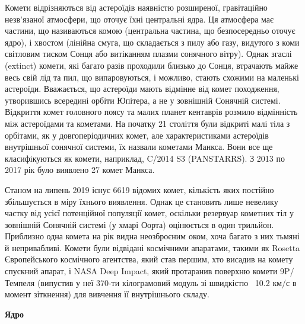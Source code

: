 \documentclass[a4paper]{article}
\begin{document}
    Комети відрізняються від астероїдів наявністю розширеної, гравітаційно незв'язаної атмосфери, що оточує їхні центральні ядра. Ця атмосфера має частини, що називаються комою (центральна частина, що безпосередньо оточує ядро), і хвостом (лінійна смуга, що складається з пилу або газу, видутого з коми світловим тиском Сонця або витіканням плазми сонячного вітру). Однак згаслі (extinct) комети, які багато разів проходили близько до Сонця, втрачають майже весь свій лід та пил, що випаровуються, і можливо, стають схожими на маленькі астероїди. Вважається, що астероїди мають відмінне від комет походження, утворившись всередині орбіти Юпітера, а не у зовнішній Сонячній системі. Відкриття комет головного поясу та малих планет кентаврів\cite{14} розмило відмінність між астероїдами та кометами. На початку 21 століття були відкриті малі тіла з орбітами, як у довгоперіодичних комет, але характеристиками астероїдів внутрішньої сонячної системи, їх назвали кометами Манкса. Вони все ще класифікуються як комети, наприклад, C/2014 S3 (PANSTARRS). З 2013 по 2017 рік було виявлено 27 комет Манкса.
    
    Станом на липень 2019 існує 6619 відомих комет, кількість яких постійно збільшується в міру їхнього виявлення. Однак це становить лише невелику частку від усієї потенційної популяції комет, оскільки резервуар кометних тіл у зовнішній Сонячній системі (у хмарі Оорта) оцінюється в один трильйон. Приблизно одна комета на рік видна неозброєним оком, хоча багато з них тьмяні й непривабливі. Комети були відвідані космічними апаратами, такими як Rosetta Європейського космічного агентства, який став першим, хто висадив на комету спускний апарат, і NASA Deep Impact, який протаранив поверхню комети 9P/Темпеля (випустив у неї 370-ти кілограмовий модуль зі швидкістю ~10.2 км/с в момент зіткнення) для вивчення її внутрішнього складу.
    
    \textbf{Ядро}
    
\end{document}
